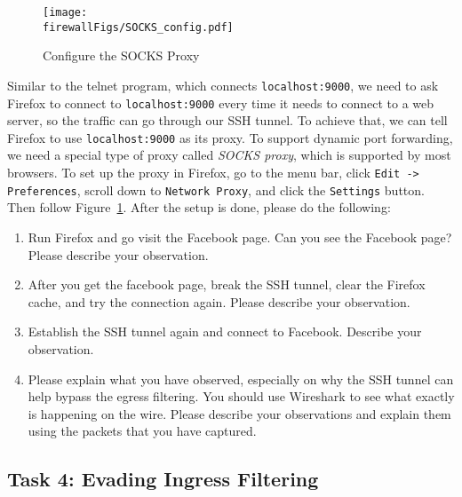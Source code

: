 \begin{figure}[htb]
  \begin{center}
     \texttt{[image: \\firewallFigs/SOCKS\_config.pdf]}
  \end{center}
  \caption{Configure the SOCKS Proxy}
  \label{firewall:fig:socks_config}
\end{figure}



Similar to the telnet program, which connects {\tt localhost:9000}, 
we need to ask Firefox to connect to {\tt localhost:9000} every time it 
needs to connect to a web server, so the traffic can 
go through our SSH tunnel. To achieve that, we can tell Firefox to
use {\tt localhost:9000} as its proxy. 
To support dynamic port forwarding, we need a special type of proxy 
called \textit{SOCKS proxy}, which is supported by most browsers. 
To set up the proxy in Firefox, go to the menu bar, 
click \texttt{Edit -> Preferences}, 
scroll down to \texttt{Network Proxy},  and
click the \texttt{Settings} button.
Then follow Figure~\ref{firewall:fig:socks_config}.
After the setup is done, please do the following:


\begin{enumerate}
\item Run Firefox and go visit the Facebook page.
Can you see the Facebook page? 
Please describe your observation. 

\item After you get the facebook page, break the SSH tunnel, 
clear the Firefox cache, and try the connection again. 
Please describe your observation. 

\item Establish the SSH tunnel again and connect to Facebook. 
Describe your observation. 

\item Please explain what you have observed, especially
on why the SSH tunnel can help bypass the egress filtering. 
You should use Wireshark to see
what exactly is happening on the wire. Please describe your 
observations and explain them using the packets that you
have captured.
\end{enumerate}


\subsection{Task 4: Evading Ingress Filtering}


